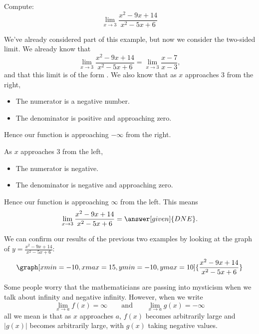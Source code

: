 \documentclass{ximera}
\begin{document}
\begin{example}
  Compute:
  \[
  \lim_{x\to 3} \frac{x^2-9x+14}{x^2-5x+6}
  \]
  \begin{explanation}
    We've already considered part of this example, but now we consider the two-sided limit. We already know that
    \[
    \lim_{x\to 3} \frac{x^2-9x+14}{x^2-5x+6} = \lim_{x\to
      3}\frac{x-7}{x-3},
    \]
    and that this limit is of the form \numOverZero.
    We also know that as $x$ approaches $3$ from the right,
    \begin{itemize}
    \item The numerator is a negative number. 
    \item The denominator is positive and approaching zero.
    \end{itemize}
    Hence our function is approaching $-\infty$ from the right.
    
    As $x$ approaches $3$ from the left,
    \begin{itemize}
    \item The numerator is negative.
    \item The denominator is negative and approaching zero.
    \end{itemize}
    Hence our function is approaching $\infty$ from the left.
    This means
    \[
    \lim_{x\to 3} \frac{x^2-9x+14}{x^2-5x+6} = \answer[given]{DNE}.
    \]
    \begin{onlineOnly}
     We can confirm our results of the previous two examples by looking at the graph of $y=\frac{x^2-9x+14}{x^2-5x+6}$:
     \[
     \graph[xmin=-10,xmax=15,ymin=-10,ymax=10]{\frac{x^2-9x+14}{x^2-5x+6}}
     \]
   \end{onlineOnly}
  \end{explanation}
\end{example}

Some people worry that the mathematicians are passing into mysticism
when we talk about infinity and negative infinity. However, when we write
\[
\lim_{x\to a} f(x) = \infty \qquad\text{and}\qquad \lim_{x\to a} g(x) = -\infty
\]
all we mean is that as $x$ approaches $a$, $f(x)$ becomes arbitrarily
large and $|g(x)|$ becomes arbitrarily large, with $g(x)$ taking
negative values.
\end{document}
